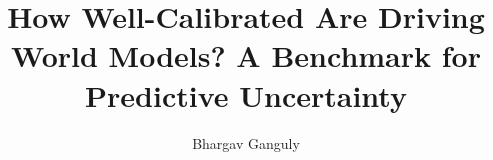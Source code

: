 \documentclass[10pt,twocolumn,letterpaper]{article}
\title{How Well-Calibrated Are Driving World Models? A Benchmark for Predictive Uncertainty}
\author{Bhargav Ganguly\\
\TODO{Institution}
}
\begin{document}
\maketitle
    





{
    \small
    
    
}
\end{document}
